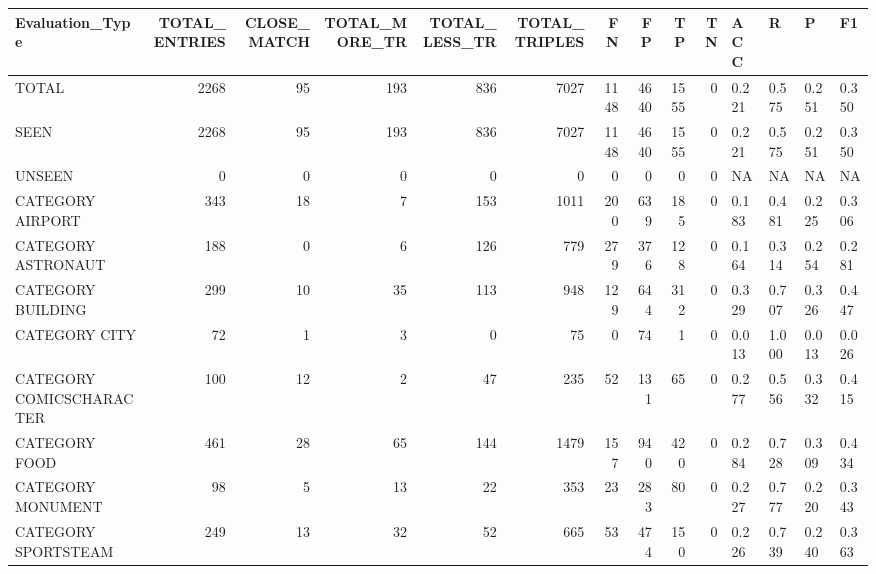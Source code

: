 \begin{tabular}{lrrrrrrrrrllll}
\hline
 Evaluation\_Type          &   TOTAL\_ENTRIES &   CLOSE\_MATCH &   TOTAL\_MORE\_TR &   TOTAL\_LESS\_TR &   TOTAL\_TRIPLES &   FN &   FP &   TP &   TN & ACC   & R     & P     & F1    \\
\hline
 TOTAL                    &            2268 &            95 &             193 &             836 &            7027 & 1148 & 4640 & 1555 &    0 & 0.221 & 0.575 & 0.251 & 0.350 \\
 SEEN                     &            2268 &            95 &             193 &             836 &            7027 & 1148 & 4640 & 1555 &    0 & 0.221 & 0.575 & 0.251 & 0.350 \\
 UNSEEN                   &               0 &             0 &               0 &               0 &               0 &    0 &    0 &    0 &    0 & NA    & NA    & NA    & NA    \\
 CATEGORY AIRPORT         &             343 &            18 &               7 &             153 &            1011 &  200 &  639 &  185 &    0 & 0.183 & 0.481 & 0.225 & 0.306 \\
 CATEGORY ASTRONAUT       &             188 &             0 &               6 &             126 &             779 &  279 &  376 &  128 &    0 & 0.164 & 0.314 & 0.254 & 0.281 \\
 CATEGORY BUILDING        &             299 &            10 &              35 &             113 &             948 &  129 &  644 &  312 &    0 & 0.329 & 0.707 & 0.326 & 0.447 \\
 CATEGORY CITY            &              72 &             1 &               3 &               0 &              75 &    0 &   74 &    1 &    0 & 0.013 & 1.000 & 0.013 & 0.026 \\
 CATEGORY COMICSCHARACTER &             100 &            12 &               2 &              47 &             235 &   52 &  131 &   65 &    0 & 0.277 & 0.556 & 0.332 & 0.415 \\
 CATEGORY FOOD            &             461 &            28 &              65 &             144 &            1479 &  157 &  940 &  420 &    0 & 0.284 & 0.728 & 0.309 & 0.434 \\
 CATEGORY MONUMENT        &              98 &             5 &              13 &              22 &             353 &   23 &  283 &   80 &    0 & 0.227 & 0.777 & 0.220 & 0.343 \\
 CATEGORY SPORTSTEAM      &             249 &            13 &              32 &              52 &             665 &   53 &  474 &  150 &    0 & 0.226 & 0.739 & 0.240 & 0.363 \\

\end{tabular}
